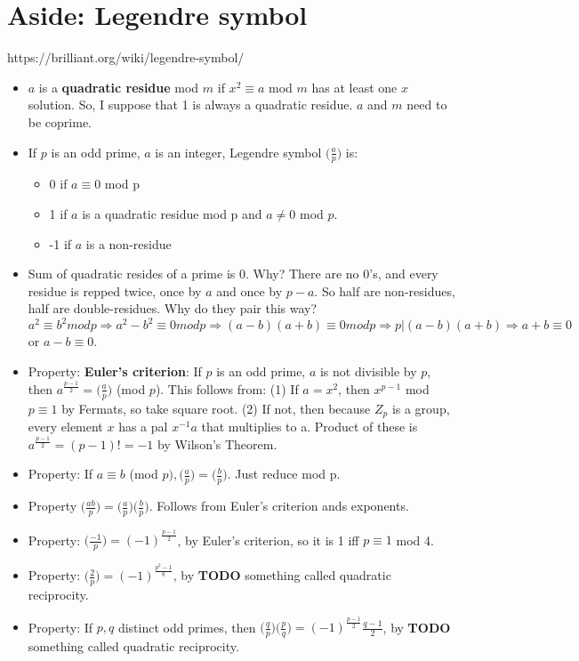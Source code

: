 \documentclass[11pt, oneside]{article}   	%
\begin{document}
\section{Aside: Legendre symbol}

https://brilliant.org/wiki/legendre-symbol/

\begin{itemize}
\item $a$ is a \textbf{quadratic residue} mod $m$ if $x^2 \equiv a$ mod $m$ has at least one $x$ solution.  So, I suppose that 1 is always a quadratic residue.    $a$ and $m$ need to be coprime.
\item If $p$ is an odd prime, $a$ is an integer, Legendre symbol $\Big(\frac{a}{p}\Big)$ is:
 \begin{itemize}
 \item 0 if $a \equiv 0$ mod p
 \item 1 if $a$ is a quadratic residue mod p and $a \neq 0$ mod $p$.
 \item -1 if $a$ is a non-residue 
 \end{itemize}
 \item Sum of quadratic resides of a prime is 0.  Why?  There are no 0's, and every residue is repped twice, once by $a$ and once by $p-a$.  So half are non-residues, half are double-residues.  Why do they pair this way?  $a^2 \equiv b^2 mod p \Rightarrow a^2 - b^2 \equiv 0 mod p \Rightarrow (a-b)(a+b) \equiv 0 mod p \Rightarrow p | (a-b)(a+b) \Rightarrow a+b \equiv 0$ or $a-b \equiv 0$.
 \item Property:  \textbf{Euler's criterion}: If $p$ is an odd prime, $a$ is not divisible by $p$, then $a^\frac{p-1}{2} = \Big(\frac{a}{p}\Big)$ (mod $p$).  This follows from: (1) If $a = x^2$, then $x^{p-1}$ mod $p \equiv 1$ by Fermats, so take square root.  (2) If not, then because $Z_p$ is a group, every element $x$ has a pal $x^{-1}a$ that multiplies to a.  Product of these is  $a^\frac{p-1}{2} = (p-1)! = -1$ by Wilson's Theorem.
\item Property:  If $a \equiv b$ (mod $p), \Big(\frac{a}{p}\Big) =   \Big(\frac{b}{p}\Big)$.  Just reduce mod p.
\item Property  $ \Big(\frac{ab}{p}\Big) =   \Big(\frac{a}{p}\Big)   \Big(\frac{b}{p}\Big)$.  Follows from Euler's criterion ands exponents.
\item Property:   $\Big(\frac{-1}{p}\Big) = (-1)^\frac{p-1}{2}$, by Euler's criterion, so it is 1 iff $p \equiv 1$ mod 4.
\item Property:   $\Big(\frac{2}{p}\Big) = (-1)^\frac{p^2-1}{8}$, by \textbf{TODO} something called quadratic reciprocity.
\item Property:  If $p, q$ distinct odd primes, then $\Big(\frac{q}{p}\Big) \Big(\frac{p}{q}\Big)  = (-1)^\frac{p-1}{2}\frac{q-1}{2}$, by \textbf{TODO} something called quadratic reciprocity.


\end{itemize}
\end{document}
